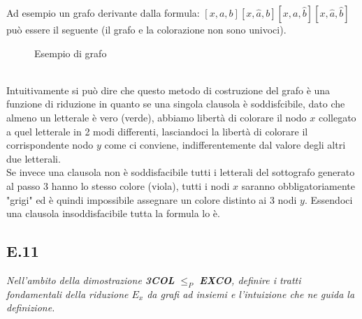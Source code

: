 \documentclass[a4paper]{article}
\begin{document}
Ad esempio un grafo derivante dalla formula: $[x,a,b][x,\hat a, b][x,a,\hat b][x, \hat a, \hat b]$ può essere il seguente (il grafo e la colorazione non sono univoci).
		\begin{figure}[!ht]
		\centering
		\caption{Esempio di grafo} \label{FIG:E10_finale}
		\end{figure}\\
Intuitivamente si può dire che questo metodo di costruzione del grafo è una funzione di riduzione in quanto se una singola clausola è soddisfcibile, dato che almeno un letterale è vero (verde), abbiamo libertà di colorare il nodo $x$ collegato a quel letterale in 2 modi differenti, lasciandoci la libertà di colorare il corrispondente nodo $y$ come ci conviene, indifferentemente dal valore degli altri due letterali.\\
Se invece una clausola non è soddisfacibile tutti i letterali del sottografo generato al passo 3 hanno lo stesso colore (viola), tutti i nodi $x$ saranno obbligatoriamente "grigi" ed è quindi impossibile assegnare un colore distinto ai 3 nodi $y$.
Essendoci una clausola insoddisfacibile tutta la formula lo è.
\subsection{E.11}
\emph{Nell’ambito della dimostrazione \textbf{3COL} $\leq_P$ \textbf{EXCO}, definire i tratti fondamentali della riduzione $E_x$ da grafi ad insiemi e l’intuizione che ne guida la definizione.}
\end{document}
